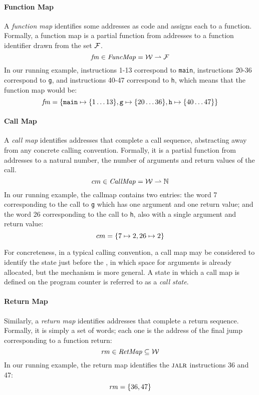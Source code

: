 \documentclass[acmsmall,review,anonymous]{acmart}\settopmatter{printfolios=true,printccs=false,printacmref=false}
\begin{document}
{\paragraph*{Function Map}

A {\em function map} identifies some addresses as code and assigns
each to a function. Formally, a function map is a
partial function from addresses to a function
identifier drawn from the set \(\mathcal{F}\).
\[\mathit{fm} \in \mathit{FuncMap} = {\mathcal W} \rightharpoonup \mathcal{F}\]
%
In our running example, instructions 1-13 correspond to {\tt main},
instructions 20-36 correspond to {\tt g}, and instructions 40-47
correspond to {\tt h}, which means that the function map would be:
\[ \mathit{fm} = \{\texttt{main} \mapsto \{1\ldots13\}, \texttt{g} \mapsto \{20\ldots36\}, \texttt{h} \mapsto \{40\ldots47\}\}\]

\paragraph*{Call Map}

A {\em call map} identifies addresses that complete a call sequence,
abstracting away from any concrete calling convention. Formally, it is
a partial function from addresses to a natural number, the number of
arguments and return values of the call.
\[cm \in \mathit{CallMap} = {\mathcal W} \rightharpoonup \mathbb{N}\]
%
In our running example, the callmap contains two entries: the word 7
corresponding to the call to {\tt g} which has one argument and one
return value; and the word 26 corresponding to the call to {\tt h},
also with a single argument and return value:
\[ cm = \{ 7 \mapsto 2, 26 \mapsto 2\}\]

For concreteness, in a typical calling convention, a call map may be
considered to identify the state just before the \jal, in which
space for arguments is already allocated, but the mechanism is more
general. A state in which a call map is defined on the program counter
is referred to as a {\it call state}.

\paragraph*{Return Map}
Similarly, a {\em return map} identifies addresses that complete a
return sequence. Formally, it is simply a set of words; each one
is the address of the final jump corresponding to a function return:
%
\[\mathit{rm} \in \mathit{RetMap} \subseteq {\mathcal W}\]
%
In our running example, the return map identifies the $\textsc{jalr}$
instructions 36 and 47:
\[ \mathit{rm} = \{36, 47\} \]

}
\end{document}
